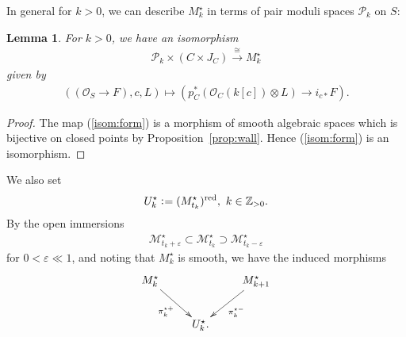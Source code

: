 \documentclass[11pt]{amsart}
\theoremstyle{plain}
\newtheorem{lem}[thm]{Lemma}
\newcommand{\mM}{\mathcal{M}}
\newcommand{\oO}{\mathcal{O}}
\newcommand{\pP}{\mathcal{P}}
\begin{document}
In general for $k>0$, we can 
describe $M_k^{\star}$ in terms of 
pair moduli spaces $\pP_k$ on $S$: 
\begin{lem}\label{lem:isom:star}
For $k>0$, we have an isomorphism
\begin{align}\label{isom:star1}
\pP_k \times (C \times J_C) 
\stackrel{\cong}{\to}
M_k^{\star}
\end{align}
given by 
\begin{align}\label{isom:form}
((\oO_S \to F), c, L) \mapsto 
\left(
p_C^{\ast}(\oO_C(k[c]) \otimes L)
\to i_{c\ast}F\right).
\end{align}
\end{lem}
\begin{proof}
The map 
(\ref{isom:form}) is a morphism of smooth 
algebraic spaces which is bijective on closed points
by Proposition~\ref{prop:wall}.
Hence (\ref{isom:form}) is an isomorphism. 
\end{proof}
We also set
\begin{align*}
U_k^{\star} \cneq (M_{t_k}^{\star})^{\rm{red}}, \ 
k \in \mathbb{Z}_{> 0}. 
\end{align*}
By the open immersions
\begin{align*}
\mM_{t_k+\varepsilon}^{\star} \subset \mM_{t_k}^{\star} \supset
\mM_{t_k-\varepsilon}^{\star}
\end{align*}
for $0<\varepsilon \ll 1$, 
and noting that $M_k^{\star}$ is smooth, 
we have the induced morphisms
\begin{align}\label{dia:Mstar}
\xymatrix{
M_k^{\star} \ar[rd] _-{\pi_k^{\star+}}& & M_{k+1}^{\star} \ar[ld]^-{\pi_k^{\star-}} \\
& U_k^{\star}. &
}
\end{align}
\end{document}
